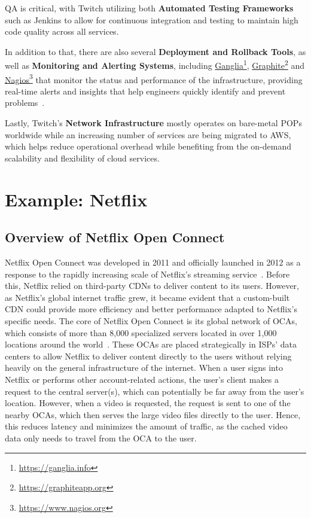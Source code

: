 \begin{enumerate}
    \ac{QA} is critical, with Twitch utilizing both \textbf{Automated Testing Frameworks} such as Jenkins to allow for continuous integration and testing to maintain high code quality across all services.

    In addition to that, there are also several \textbf{Deployment and Rollback Tools}, as well as \textbf{Monitoring and Alerting Systems}, including \href{https://ganglia.info}{Ganglia}\footnote{\url{https://ganglia.info}}, \href{https://graphiteapp.org}{Graphite}\footnote{\url{https://graphiteapp.org}} and \href{https://www.nagios.org}{Nagios}\footnote{\url{https://www.nagios.org}} that monitor the status and performance of the infrastructure, providing real-time alerts and insights that help engineers quickly identify and prevent problems~\parencite{twitch_engineering}.

    Lastly, Twitch’s \textbf{Network Infrastructure} mostly operates on bare-metal \ac{POPs} worldwide while an increasing number of services are being migrated to \ac{AWS}, which helps reduce operational overhead while benefiting from the on-demand scalability and flexibility of cloud services.

\end{enumerate}

\section{Example: Netflix}


\subsection{Overview of Netflix Open Connect}

Netflix Open Connect was developed in 2011 and officially launched in 2012 as a response to the rapidly increasing scale of Netflix's streaming service~\parencite{netflix_functionality}. Before this, Netflix relied on third-party \ac{CDN}s to deliver content to its users. However, as Netflix's global internet traffic grew, it became evident that a custom-built \ac{CDN} could provide more efficiency and better performance adapted to Netflix's specific needs.
The core of Netflix Open Connect is its global network of \ac{OCAs}, which consists of more than 8,000 specialized servers located in over 1,000 locations around the world~\parencite{netflix_open_connect}. These \ac{OCAs} are placed strategically in \ac{ISPs}' data centers to allow Netflix to deliver content directly to the users without relying heavily on the general infrastructure of the internet.
When a user signs into Netflix or performs other account-related actions, the user's client makes a request to the central server(s), which can potentially be far away from the user's location. However, when a video is requested, the request is sent to one of the nearby \ac{OCAs}, which then serves the large video files directly to the user. Hence, this reduces latency and minimizes the amount of traffic, as the cached video data only needs to travel from the OCA to the user.

